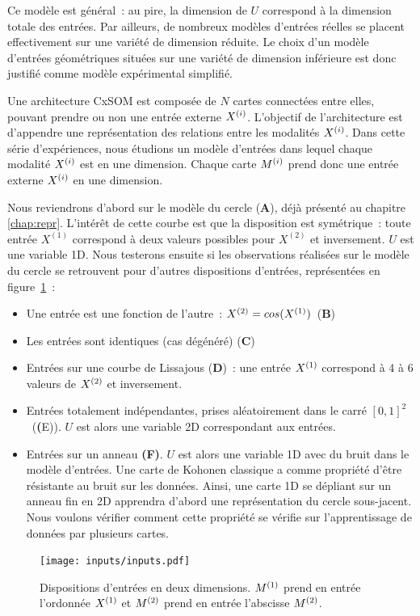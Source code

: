 \documentclass[../main]{subfiles}
\begin{document}
Ce modèle est général~: au pire, la dimension de $U$ correspond à la dimension totale des entrées. 
Par ailleurs, de nombreux modèles d'entrées réelles se placent effectivement sur une variété de dimension réduite. Le choix d'un modèle d'entrées géométriques situées sur une variété de dimension inférieure est donc justifié comme modèle expérimental simplifié.

Une architecture CxSOM est composée de $N$ cartes connectées entre elles, pouvant prendre ou non une entrée externe $X^{({i})}$. L'objectif de l'architecture est d'appendre une représentation des relations entre les modalités $X^{({i})}$.
Dans cette série d'expériences, nous étudions un modèle d'entrées dans lequel chaque modalité $X^{({i})}$ est en une dimension. Chaque carte $M^{({i})}$ prend donc une entrée externe $X^{({i})}$ en une dimension.

Nous reviendrons d'abord sur le modèle du cercle (\textbf{A}), déjà présenté au chapitre \ref{chap:repr}. L'intérêt de cette courbe est que la disposition est symétrique~: toute entrée $X^{(1)}$ correspond à deux valeurs possibles pour $X^{(2)}$ et inversement. $U$ est une variable 1D.
Nous testerons ensuite si les observations réalisées sur le modèle du cercle se retrouvent pour d'autres dispositions d'entrées, représentées en figure~\ref{fig:input_list}~:
\begin{itemize}
	\item Une entrée est une fonction de l'autre~: $X^{({2})} = cos(X^{({1})})$~(\textbf{B})
	\item Les entrées sont identiques (cas dégénéré) (\textbf{C})
	\item Entrées sur une courbe de Lissajous (\textbf{D})~: une entrée $X^{({1})}$ correspond à 4 à 6 valeurs de $X^{({2})}$ et inversement.
	\item Entrées totalement indépendantes, prises aléatoirement dans le carré $[0,1]^2$~(\textbf({E})). $U$ est alors une variable 2D correspondant aux entrées.
	\item Entrées sur un anneau \textbf{(F)}. $U$ est alors une variable 1D avec du bruit dans le modèle d'entrées. Une carte de Kohonen classique a comme propriété d'être résistante au bruit sur les données. Ainsi, une carte 1D se dépliant sur un anneau fin en 2D apprendra d'abord une représentation du cercle sous-jacent. Nous voulons vérifier comment cette propriété se vérifie sur l'apprentissage de données par plusieurs cartes.
\end{itemize}

\begin{figure}[h!]
	\texttt{[image: inputs/inputs.pdf]}
	\caption{Dispositions d'entrées en deux dimensions. $M^{({1})}$ prend en entrée l'ordonnée $X^{({1})}$ et $M^{({2})}$ prend en entrée l'abscisse $M^{({2})}$. \label{fig:input_list}}
\end{figure}
\end{document}
